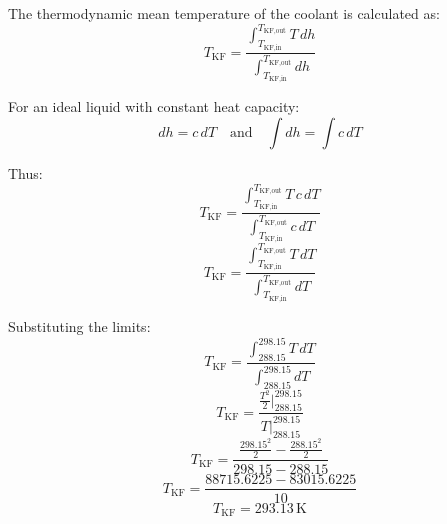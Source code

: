 The thermodynamic mean temperature of the coolant is calculated as:  
\[
T_{\text{KF}} = \frac{\int_{T_{\text{KF,in}}}^{T_{\text{KF,out}}} T \, dh}{\int_{T_{\text{KF,in}}}^{T_{\text{KF,out}}} dh}
\]  

For an ideal liquid with constant heat capacity:  
\[
dh = c \, dT \quad \text{and} \quad \int dh = \int c \, dT
\]  

Thus:  
\[
T_{\text{KF}} = \frac{\int_{T_{\text{KF,in}}}^{T_{\text{KF,out}}} T \, c \, dT}{\int_{T_{\text{KF,in}}}^{T_{\text{KF,out}}} c \, dT}
\]  
\[
T_{\text{KF}} = \frac{\int_{T_{\text{KF,in}}}^{T_{\text{KF,out}}} T \, dT}{\int_{T_{\text{KF,in}}}^{T_{\text{KF,out}}} dT}
\]  

Substituting the limits:  
\[
T_{\text{KF}} = \frac{\int_{288.15}^{298.15} T \, dT}{\int_{288.15}^{298.15} dT}
\]  
\[
T_{\text{KF}} = \frac{\frac{T^2}{2} \Big|_{288.15}^{298.15}}{T \Big|_{288.15}^{298.15}}
\]  
\[
T_{\text{KF}} = \frac{\frac{298.15^2}{2} - \frac{288.15^2}{2}}{298.15 - 288.15}
\]  
\[
T_{\text{KF}} = \frac{88715.6225 - 83015.6225}{10}
\]  
\[
T_{\text{KF}} = 293.13 \, \text{K}
\]
